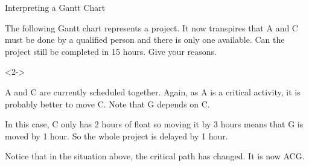 \documentclass[8pt]{beamer}
\begin{document}
\begin{frame}{Interpreting a Gantt Chart}
	\begin{problem}
		\begin{minipage}{.5\linewidth}
The following Gantt chart represents a project. It now transpires that A and C must be done by a qualified person and there is only one available. Can the project still be completed in 15 hours. Give your reasons.
\end{minipage}%
\begin{minipage}{.5\linewidth}
		\centering
\end{minipage}
	\end{problem}

\begin{solution}<2->
	\begin{minipage}{.5\linewidth}
	A and C are currently scheduled together. Again, as A is a critical activity, it is probably better to move C. Note that G depends on C.

	In this case, C only has 2 hours of float so moving it by 3 hours means that G is moved by 1 hour. So the whole project is delayed by 1 hour.

	\alert<3>{Notice that in the situation above, the critical path has changed. It is now ACG.}
\end{minipage}%
\begin{minipage}{.5\linewidth}
		\centering

\end{minipage}
\end{solution}


\end{frame}
\end{document}
